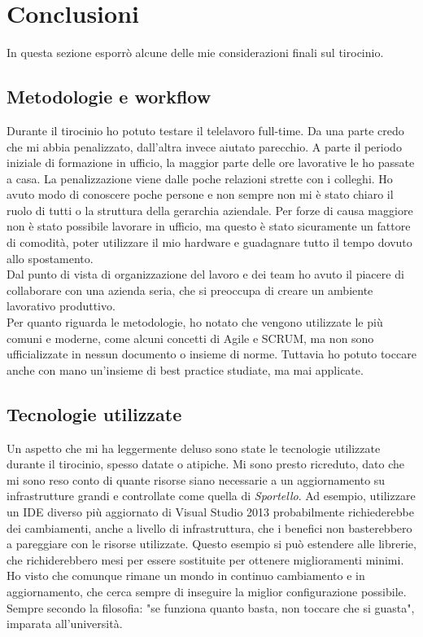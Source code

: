 \section{Conclusioni}

In questa sezione esporrò alcune delle mie considerazioni finali sul tirocinio.

\subsection{Metodologie e workflow}
Durante il tirocinio ho potuto testare il telelavoro full-time. Da una parte credo che mi abbia penalizzato, dall'altra invece aiutato parecchio. A parte il periodo iniziale di formazione in ufficio, la maggior parte delle ore lavorative le ho passate a casa. La penalizzazione viene dalle poche relazioni strette con i colleghi. Ho avuto modo di conoscere poche persone e non sempre non mi è stato chiaro il ruolo di tutti o la struttura della gerarchia aziendale. Per forze di causa maggiore non è stato possibile lavorare in ufficio, ma questo è stato sicuramente un fattore di comodità, poter utilizzare il mio hardware e guadagnare tutto il tempo dovuto allo spostamento. \\
Dal punto di vista di organizzazione del lavoro e dei team ho avuto il piacere di collaborare con una azienda seria, che si preoccupa di creare un ambiente lavorativo produttivo. \\
Per quanto riguarda le metodologie, ho notato che vengono utilizzate le più comuni e moderne, come alcuni concetti di Agile e SCRUM, ma non sono ufficializzate in nessun documento o insieme di norme. 
Tuttavia ho potuto toccare anche con mano un'insieme di best practice studiate, ma mai applicate. 

\subsection{Tecnologie utilizzate}
Un aspetto che mi ha leggermente deluso sono state le tecnologie utilizzate durante il tirocinio, spesso datate o atipiche. Mi sono presto ricreduto, dato che mi sono reso conto di quante risorse siano necessarie a un aggiornamento su infrastrutture grandi e controllate come quella di \textit{Sportello}. Ad esempio, utilizzare un IDE diverso più aggiornato di Visual Studio 2013 probabilmente richiederebbe dei cambiamenti, anche a livello di infrastruttura, che i benefici non basterebbero a pareggiare con le risorse utilizzate. Questo esempio si può estendere alle librerie, che richiderebbero mesi per essere sostituite per ottenere miglioramenti minimi. \\ Ho visto che comunque rimane un mondo in continuo cambiamento e in aggiornamento, che cerca sempre di inseguire la miglior configurazione possibile. Sempre secondo la filosofia: "se funziona quanto basta, non toccare che si guasta", imparata all'università.

